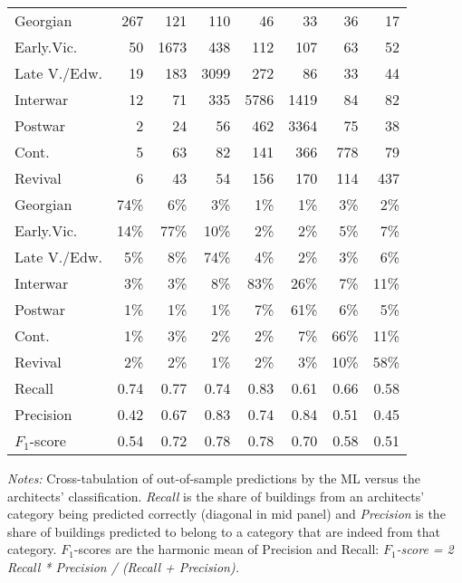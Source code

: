 \begin{table}[!htb]
\begin{tabular}{lrrrrrrr}
	Georgian & 267 & 121 & 110 & 46 & 33 & 36 & 17 \\
	  Early.Vic. & 50 & 1673 & 438 & 112 & 107 & 63 & 52 \\
	  Late V./Edw. & 19 & 183 & 3099 & 272 & 86 & 33 & 44 \\
	  Interwar & 12 & 71 & 335 & 5786 & 1419 & 84 & 82 \\
	  Postwar & 2 & 24 & 56 & 462 & 3364 & 75 & 38 \\
	  Cont. & 5 & 63 & 82 & 141 & 366 & 778 & 79 \\
	  Revival & 6 & 43 & 54 & 156 & 170 & 114 & 437 \\
	\cmidrule(lr){1-1}
\cmidrule(lr){2-8}
	  Georgian & 74\% & 6\% & 3\% & 1\% & 1\% & 3\% & 2\% \\
	  Early.Vic. & 14\% & 77\% & 10\% & 2\% & 2\% & 5\% & 7\% \\
	  Late V./Edw. & 5\% & 8\% & 74\% & 4\% & 2\% & 3\% & 6\% \\
	  Interwar & 3\% & 3\% & 8\% & 83\% & 26\% & 7\% & 11\% \\
	  Postwar & 1\% & 1\% & 1\% & 7\% & 61\% & 6\% & 5\% \\
	  Cont. & 1\% & 3\% & 2\% & 2\% & 7\% & 66\% & 11\% \\
	  Revival & 2\% & 2\% & 1\% & 2\% & 3\% & 10\% & 58\% \\
		\cmidrule(lr){1-1}
\cmidrule(lr){2-8}
	  Recall & 0.74 & 0.77 & 0.74 & 0.83 & 0.61 & 0.66 & 0.58 \\
	  Precision & 0.42 & 0.67 & 0.83 & 0.74 & 0.84 & 0.51 & 0.45 \\
	  $F_1$-score & 0.54 & 0.72 & 0.78 & 0.78 & 0.70 & 0.58 & 0.51 \\
	 \bottomrule
\end{tabular}

\begin{minipage}{\textwidth}
\footnotesize
\vspace{0.25cm}
	\emph{Notes:} Cross-tabulation of out-of-sample predictions by the ML versus the architects' classification.
	\emph{Recall} is the share of buildings from an architects' category being predicted correctly (diagonal in mid panel) and \emph{Precision} is the share of buildings predicted to belong to a category that are indeed from that category.
	$F_1$-scores are the harmonic mean of Precision and Recall: \emph{ $F_1$-score = 2 Recall * Precision / (Recall + Precision).}
\end{minipage}


\endgroup
\end{table}
